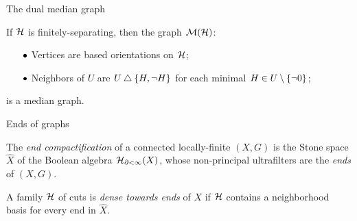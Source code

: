 \documentclass{beamer}
\begin{document}
\begin{frame}{The dual median graph}
        \vspace{-0.4in}
        \pause

        \begin{theorem}[Sageev 95]
            If $\mathcal{H}$ is finitely-separating, then the graph $\mathcal{M}(\mathcal{H})$:
                \begin{itemize}
                    \item[\scriptsize$\bullet$]\small Vertices are based orientations on $\mathcal{H}$;
                    \item[\scriptsize$\bullet$]\small Neighbors of $U$ are $U\bigtriangleup\left\{H,\lnot H\right\}$ for each minimal $H\in U\setminus\left\{\lnot0\right\}$;
                \end{itemize}
            is a median graph.
        \end{theorem}
    \end{frame}
    \begin{frame}{Ends of graphs}
        \begin{definition}
            The \textit{end compactification} of a connected locally-finite $(X,G)$ is the Stone space $\widehat{X}$ of the Boolean algebra $\mathcal{H}_{\partial<\infty}(X)$, whose non-principal ultrafilters are the \textit{ends} of $(X,G)$.
        \end{definition}

        \vspace{-0.2in}


        \pause
        \vspace{-0.2in}

        \begin{definition}
            A family $\mathcal{H}$ of cuts is \textit{dense towards ends} of $X$ if $\mathcal{H}$ contains a neighborhood basis for every end in $\widehat{X}$.
        \end{definition}
    \end{frame}
\end{document}
